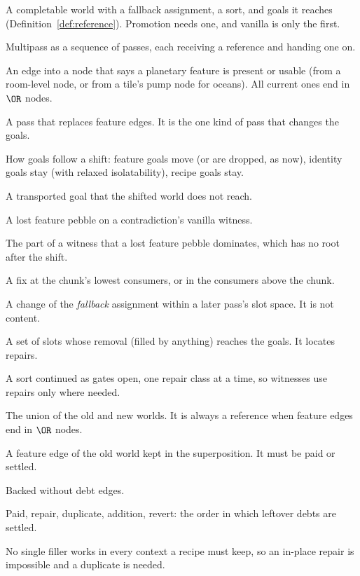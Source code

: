 \begin{description}[style=nextline, font=\normalfont\bfseries, nosep, itemsep=3pt]
\item[Reference] A completable world with a fallback assignment, a sort, and goals it reaches (Definition~\ref{def:reference}). Promotion needs one, and vanilla is only the first.
\item[Relay] Multipass as a sequence of passes, each receiving a reference and handing one on.
\item[Feature edge] An edge into a node that says a planetary feature is present or usable (from a room-level node, or from a tile's pump node for oceans). All current ones end in $\OR$ nodes.
\item[Shift] A pass that replaces feature edges. It is the one kind of pass that changes the goals.
\item[Transport] How goals follow a shift: feature goals move (or are dropped, as now), identity goals stay (with relaxed isolatability), recipe goals stay.
\item[Contradiction] A transported goal that the shifted world does not reach.
\item[Cause] A lost feature pebble on a contradiction's vanilla witness.
\item[Chunk] The part of a witness that a lost feature pebble dominates, which has no root after the shift.
\item[Root / leaf repair] A fix at the chunk's lowest consumers, or in the consumers above the chunk.
\item[Repair] A change of the \emph{fallback} assignment within a later pass's slot space. It is not content.
\item[Relaxed repair] A set of slots whose removal (filled by anything) reaches the goals. It locates repairs.
\item[Staged sort] A sort continued as gates open, one repair class at a time, so witnesses use repairs only where needed.
\item[Superposition] The union of the old and new worlds. It is always a reference when feature edges end in $\OR$ nodes.
\item[Debt edge] A feature edge of the old world kept in the superposition. It must be paid or settled.
\item[Solvent] Backed without debt edges.
\item[Settlement ladder] Paid, repair, duplicate, addition, revert: the order in which leftover debts are settled.
\item[Context conflict] No single filler works in every context a recipe must keep, so an in-place repair is impossible and a duplicate is needed.
\end{description}
